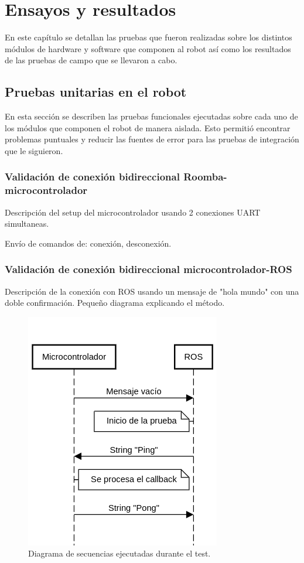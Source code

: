 
\chapter{Ensayos y resultados} %

\label{Capitulo4}

En este capítulo se detallan las pruebas que fueron realizadas sobre los distintos módulos de hardware y software que componen al robot así como los resultados de las pruebas de campo que se llevaron a cabo.

\section{Pruebas unitarias en el robot}

En esta sección se describen las pruebas funcionales ejecutadas sobre cada uno de los módulos que componen el robot de manera aislada. Esto permitió encontrar problemas puntuales y reducir las fuentes de error para las pruebas de integración que le siguieron.

\subsection{Validación de conexión bidireccional Roomba-microcontrolador}

Descripción del setup del microcontrolador usando 2 conexiones UART simultaneas.

Envío de comandos de: conexión, desconexión.

\subsection{Validación de conexión bidireccional microcontrolador-ROS}

Descripción de la conexión con ROS usando un mensaje de "hola mundo" con una doble confirmación. Pequeño diagrama explicando el método.

\begin{figure}[ht]
    \centering
    \includegraphics[scale=0.6]{./Figures/comm_test1.png}
    \caption{Diagrama de secuencias ejecutadas durante el test.}
    \label{fig:rviz}
\end{figure}

